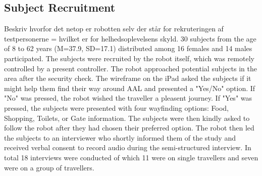 \subsection{Subject Recruitment}
{\color{red} Beskriv hvorfor det netop er robotten selv der står for rekruteringen af testpersonerne = hvilket er for helhedsoplevelsens skyld.}
30 subjects from the age of 8 to 62 years (M=37.9, SD=17.1) distributed among 16 females and 14 males participated. The subjects were recruited by the robot itself, which was remotely controlled by a present controller. The robot approached potential subjects in the area after the security check. The wireframe on the iPad asked the subjects if it might help them find their way around AAL and presented a "Yes/No" option. If "No" was pressed, the robot wished the traveller a pleasent journey. If "Yes" was pressed, the subjects were presented with four wayfinding options: Food, Shopping, Toilets, or Gate information. The subjects were then kindly asked to follow the robot after they had chosen their preferred option. The robot then led the subjects to an interviewer who shortly informed them of the study and received verbal consent to record audio during the semi-structured interview. In total 18 interviews were conducted of which 11 were on single travellers and seven were on a group of travellers.
%
